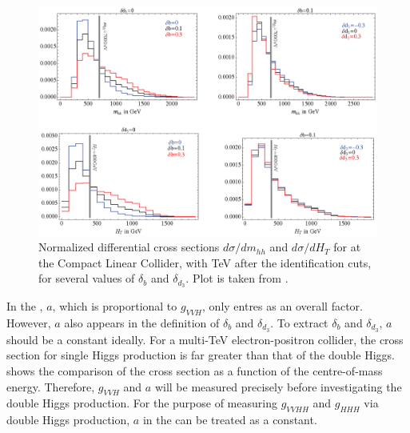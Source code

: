 \begin{figure}[htbp]
\centering
\includegraphics[width=1\textwidth]{theory/MhhHtDistribution}
\caption[]
{Normalized differential cross sections $d\sigma/dm_{hh}$ and $d\sigma/dH_{T}$ for  at the Compact Linear Collider, with  TeV after the identification cuts, for several values of $\delta_{b}$ and $\delta_{d_3}$. Plot is taken from \cite{Contino:2013gna}.}
\label{fig:theoryMhhHtDistribution}
\end{figure}

In the , $a$, which is proportional to $g_{VVH}$, only entres as an overall factor. However, $a$ also appears in the definition of $\delta_{b}$ and $\delta_{d_3}$. To extract $\delta_{b}$ and $\delta_{d_3}$, $a$ should be a constant ideally. For a multi-TeV electron-positron collider, the cross section for single Higgs production is far greater than that of the double Higgs.  shows the comparison of the cross section as a function of the centre-of-mass energy. Therefore, $g_{VVH}$ and $a$ will be measured precisely before investigating the double Higgs production. For the purpose of measuring $g_{VVHH}$ and $g_{HHH}$ via double Higgs production, $a$ in the  can be treated as a constant.

